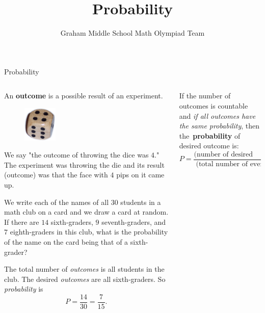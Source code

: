 \documentclass[9pt,aspectratio=169]{beamer}
\title{Probability}
\subtitle[Graham Middle School]{Graham Middle School Math Olympiad Team}
\begin{document}
\maketitle

\begin{frame}{Probability}
  \begin{columns}[T]
    \begin{column}{0.5\textwidth}
      \begin{definition}
        An \textbf{outcome} is a possible result of an experiment.
      \end{definition}

      \begin{figure}%
        \vspace{-1em}
        \includegraphics[width=0.25\textwidth]{03 - Probability/dice-4.png}
      \end{figure}
      We say "the outcome of throwing the dice was $4$." The experiment was throwing the die and its result (outcome) was that the face with $4$ pips on it came up.\medskip
  
      \begin{problem}
        We write each of the names of all $30$ students in a math club on a card and we draw a card at random. If there are $14$ sixth-graders, $9$ seventh-graders, and $7$ eighth-graders in this club, what is the probability of the name on the card being that of a sixth-grader? 
      \end{problem}
      The total number of \emph{outcomes} is all students in the club. The desired \emph{outcomes} are all sixth-graders. So \emph{probability} is
      \[
        P = \frac{14}{30} = \frac{7}{15}.
      \]
    \end{column}
    \begin{column}{0.5\textwidth}
      \begin{definition}
        If the number of outcomes is countable and \emph{if all outcomes have the same probability}, then \mbox{the~\textbf{probability}} of desired outcome is:
        \[ P = \frac{\text{(number of desired outcomes)}}{\text{(total number of events)}}. \]
        \vspace*{-1.5ex}
      \end{definition}


\end{column}
\end{columns}
\end{frame}
\end{document}
